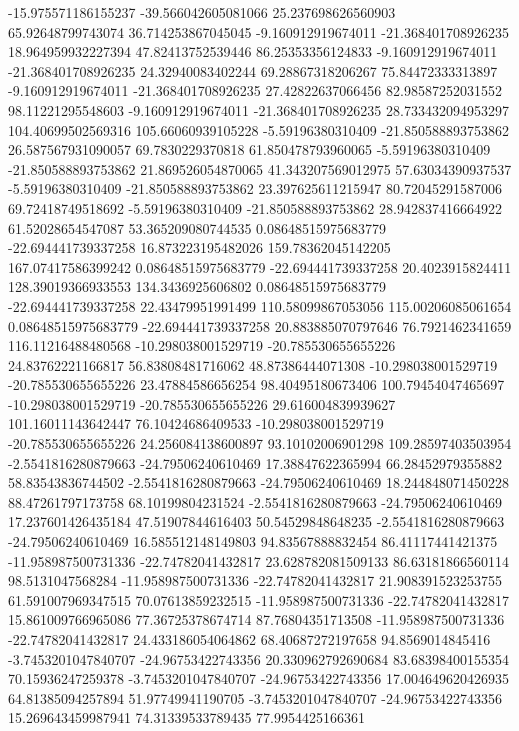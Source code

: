 -15.975571186155237 -39.566042605081066 25.237698626560903 65.92648799743074 36.714253867045045
-9.160912919674011 -21.368401708926235 18.964959932227394 47.82413752539446 86.25353356124833
-9.160912919674011 -21.368401708926235 24.32940083402244 69.28867318206267 75.84472333313897
-9.160912919674011 -21.368401708926235 27.42822637066456 82.98587252031552 98.11221295548603
-9.160912919674011 -21.368401708926235 28.733432094953297 104.40699502569316 105.66060939105228
-5.59196380310409 -21.850588893753862 26.587567931090057 69.7830229370818 61.850478793960065
-5.59196380310409 -21.850588893753862 21.869526054870065 41.343207569012975 57.63034390937537
-5.59196380310409 -21.850588893753862 23.397625611215947 80.72045291587006 69.72418749518692
-5.59196380310409 -21.850588893753862 28.942837416664922 61.52028654547087 53.365209080744535
0.08648515975683779 -22.694441739337258 16.873223195482026 159.78362045142205 167.07417586399242
0.08648515975683779 -22.694441739337258 20.4023915824411 128.39019366933553 134.3436925606802
0.08648515975683779 -22.694441739337258 22.43479951991499 110.58099867053056 115.00206085061654
0.08648515975683779 -22.694441739337258 20.883885070797646 76.7921462341659 116.11216488480568
-10.298038001529719 -20.785530655655226 24.83762221166817 56.83808481716062 48.87386444071308
-10.298038001529719 -20.785530655655226 23.47884586656254 98.40495180673406 100.79454047465697
-10.298038001529719 -20.785530655655226 29.616004839939627 101.16011143642447 76.10424686409533
-10.298038001529719 -20.785530655655226 24.256084138600897 93.10102006901298 109.28597403503954
-2.5541816280879663 -24.79506240610469 17.38847622365994 66.28452979355882 58.83543836744502
-2.5541816280879663 -24.79506240610469 18.244848071450228 88.47261797173758 68.10199804231524
-2.5541816280879663 -24.79506240610469 17.237601426435184 47.51907844616403 50.54529848648235
-2.5541816280879663 -24.79506240610469 16.585512148149803 94.83567888832454 86.41117441421375
-11.958987500731336 -22.74782041432817 23.628782081509133 86.63181866560114 98.5131047568284
-11.958987500731336 -22.74782041432817 21.908391523253755 61.591007969347515 70.07613859232515
-11.958987500731336 -22.74782041432817 15.861009766965086 77.36725378674714 87.76804351713508
-11.958987500731336 -22.74782041432817 24.433186054064862 68.40687272197658 94.8569014845416
-3.7453201047840707 -24.96753422743356 20.330962792690684 83.68398400155354 70.15936247259378
-3.7453201047840707 -24.96753422743356 17.004649620426935 64.81385094257894 51.97749941190705
-3.7453201047840707 -24.96753422743356 15.269643459987941 74.31339533789435 77.9954425166361
